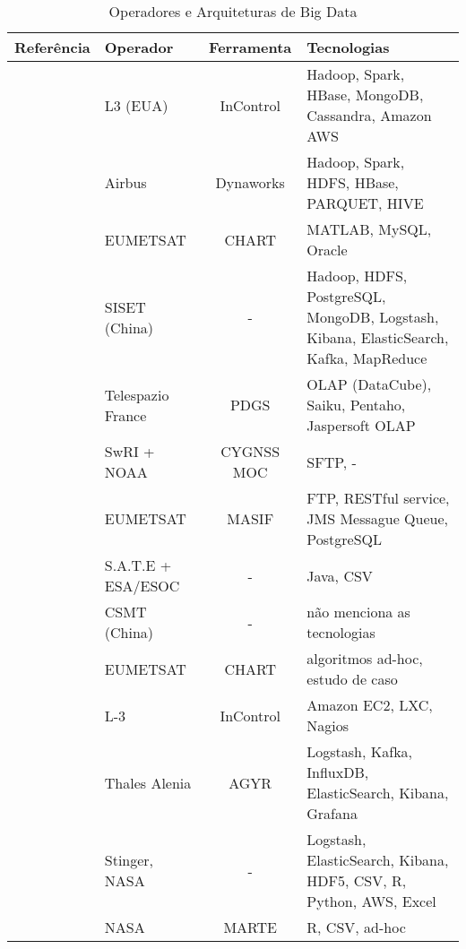 \begin{table}[htbp]
  \begin{center}
  \caption{Operadores e Arquiteturas de Big Data}
  \begin{tabular}{|C{8em}|C{6em}|c|C{10em}|}
      \hline
	  \bfseries Referência &\bfseries Operador &\bfseries Ferramenta &\bfseries Tecnologias \\
	  \hline
	  \cite{adamskiDataAnalyticsLarge2016} & L3 (EUA) & InControl & Hadoop, Spark, HBase, MongoDB, Cassandra, Amazon AWS \\
	  \hline
	  \cite{boussoufBigDataBased2018} & Airbus & Dynaworks & Hadoop, Spark, HDFS, HBase, PARQUET, HIVE \\
	  \hline
	  \cite{schulsterCHARTingFutureOffline2018} & EUMETSAT & CHART & MATLAB, MySQL, Oracle \\
	  \hline
	  \cite{zhangBigDataFramework2017} & SISET (China) & - & Hadoop, HDFS, PostgreSQL, MongoDB, Logstash, Kibana, ElasticSearch, Kafka, MapReduce \\
	  \hline
	  \cite{yvernesCopernicusGroundSegment2018} & Telespazio France & PDGS & OLAP (DataCube), Saiku, Pentaho, Jaspersoft OLAP \\
	  \hline
	  \cite{dischnerCYGNSSMOCMeeting2016} & SwRI + NOAA & CYGNSS MOC & SFTP, - \\
	  \hline
	  \cite{edwardsDealingBigData2018} & EUMETSAT & MASIF & FTP, RESTful service, JMS Messague Queue, PostgreSQL \\
	  \hline
	  \cite{evansDataMiningDrastically2016} & S.A.T.E + ESA/ESOC & - & Java, CSV \\
	  \hline
	  \cite{fenManagementOperationCommunication2016} & CSMT (China) & - & não menciona as tecnologias \\
	  \hline
	  \cite{trollopeAnalysisAutomatedTechniques2018} & EUMETSAT & CHART & algoritmos ad-hoc, estudo de caso \\
	  \hline
	  \cite{gillesFlyingLargeConstellations2016} & L-3 & InControl & Amazon EC2, LXC, Nagios \\
	  \hline
	  \cite{hennionBigdataSatelliteYearly2018} & Thales Alenia & AGYR & Logstash, Kafka, InfluxDB, ElasticSearch, Kibana, Grafana \\
	  \hline
	  \cite{mateikUsingBigData2017} & Stinger, NASA & - & Logstash, ElasticSearch, Kibana, HDF5, CSV, R, Python, AWS, Excel \\
	  \hline
	  \cite{fernandezTelemetryAnomalyDetection2017} & NASA & MARTE & R, CSV, ad-hoc \\
	  \hline
    \end{tabular}
    \end{center}
  \label{table:bigdataoperators}
\end{table}

